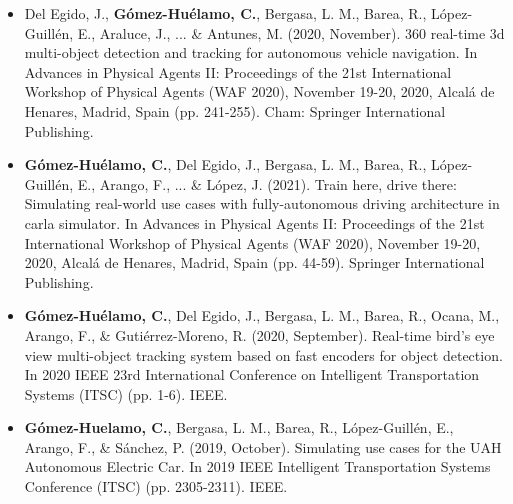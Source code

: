 \begin{refsection}
\begin{itemize}
\item Del Egido, J., \textbf{Gómez-Huélamo, C.}, Bergasa, L. M., Barea, R., López-Guillén, E., Araluce, J., ... \& Antunes, M. (2020, November). 360 real-time 3d multi-object detection and tracking for autonomous vehicle navigation. In Advances in Physical Agents II: Proceedings of the 21st International Workshop of Physical Agents (WAF 2020), November 19-20, 2020, Alcalá de Henares, Madrid, Spain (pp. 241-255). Cham: Springer International Publishing.

\item \textbf{Gómez-Huélamo, C.}, Del Egido, J., Bergasa, L. M., Barea, R., López-Guillén, E., Arango, F., ... \& López, J. (2021). Train here, drive there: Simulating real-world use cases with fully-autonomous driving architecture in carla simulator. In Advances in Physical Agents II: Proceedings of the 21st International Workshop of Physical Agents (WAF 2020), November 19-20, 2020, Alcalá de Henares, Madrid, Spain (pp. 44-59). Springer International Publishing.

\item \textbf{Gómez-Huélamo, C.}, Del Egido, J., Bergasa, L. M., Barea, R., Ocana, M., Arango, F., \& Gutiérrez-Moreno, R. (2020, September). Real-time bird’s eye view multi-object tracking system based on fast encoders for object detection. In 2020 IEEE 23rd International Conference on Intelligent Transportation Systems (ITSC) (pp. 1-6). IEEE.

\item \textbf{Gómez-Huelamo, C.}, Bergasa, L. M., Barea, R., López-Guillén, E., Arango, F., \& Sánchez, P. (2019, October). Simulating use cases for the UAH Autonomous Electric Car. In 2019 IEEE Intelligent Transportation Systems Conference (ITSC) (pp. 2305-2311). IEEE.

\end{itemize}

\end{refsection}

